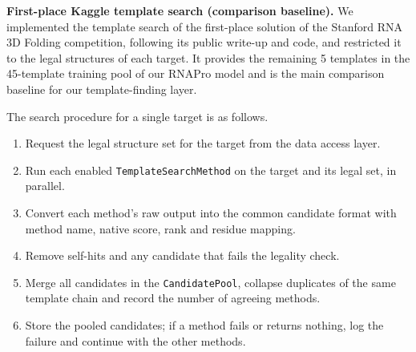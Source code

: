 \documentclass{FastFyp}
\begin{document}
\textbf{First-place Kaggle template search (comparison baseline).} We implemented the template search of the first-place solution of the Stanford RNA 3D Folding competition, following its public write-up and code, and restricted it to the legal structures of each target. It provides the remaining 5 templates in the 45-template training pool of our RNAPro model and is the main comparison baseline for our template-finding layer.

The search procedure for a single target is as follows.

\begin{enumerate}
\item Request the legal structure set for the target from the data access layer.
\item Run each enabled \texttt{TemplateSearchMethod} on the target and its legal set, in parallel.
\item Convert each method's raw output into the common candidate format with method name, native score, rank and residue mapping.
\item Remove self-hits and any candidate that fails the legality check.
\item Merge all candidates in the \texttt{CandidatePool}, collapse duplicates of the same template chain and record the number of agreeing methods.
\item Store the pooled candidates; if a method fails or returns nothing, log the failure and continue with the other methods.
\end{enumerate}
\end{document}
